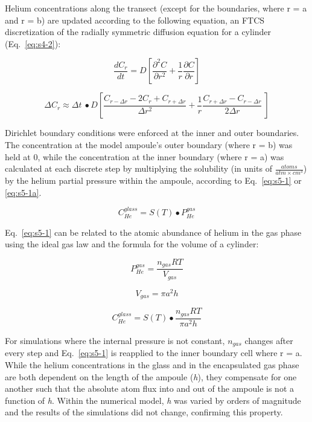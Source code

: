 Helium concentrations along the transect (except for the boundaries,
where r = a and r = b) are updated according to the following equation,
an FTCS discretization of the radially symmetric diffusion equation for
a cylinder (Eq.~\eqref{eq:s4-2}):

\[\frac{dC_{r}}{dt} = D\left\lbrack \frac{\partial^{2}C}{\partial r^{2}} + \frac{1}{r}\frac{\partial C}{\partial r} \right\rbrack\]

\begin{equation}
\Delta C_{r} \approx \Delta t\  \bullet D\left\lbrack \frac{C_{r - \Delta r} - 2C_{r} + C_{r + \Delta r}}{\Delta r^{2}} + \frac{1}{r}\frac{C_{r + \Delta r} - C_{r - \Delta r}}{2\Delta r}\  \right\rbrack
\label{eq:s5-0}
\end{equation}

Dirichlet boundary conditions were enforced at the inner and outer
boundaries. The concentration at the model ampoule's outer boundary
(where r = b) was held at 0, while the concentration at the inner
boundary (where r = a) was calculated at each discrete step by
multiplying the solubility (in units of
\(\frac{atoms}{atm \times cm^{3}}\)) by the helium partial pressure
within the ampoule, according to Eq.~\eqref{eq:s5-1} or \eqref{eq:s5-1a}.

\begin{equation}
C_{He}^{glass} = S(T) \bullet P_{He}^{gas}
\label{eq:s5-1}
\end{equation}

Eq.~\eqref{eq:s5-1} can be related to the atomic abundance of helium in the gas
phase using the ideal gas law and the formula for the volume of a
cylinder:

\[P_{He}^{gas} = \frac{n_{gas}RT}{V_{gas}}\]

\[V_{gas} = \pi a^{2}h\]

\begin{equation}
C_{He}^{glass} = S(T) \bullet \frac{n_{gas}RT}{\pi a^{2}h}
\label{eq:s5-1a}
\end{equation}

For simulations where the internal pressure is not constant, \(n_{gas}\)
changes after every step and Eq.~\eqref{eq:s5-1} is reapplied to the inner
boundary cell where r = a. While the helium concentrations in the glass
and in the encapsulated gas phase are both dependent on the length of
the ampoule (\emph{h}), they compensate for one another such that the
absolute atom flux into and out of the ampoule is not a function of
\emph{h}. Within the numerical model, \emph{h} was varied by orders of
magnitude and the results of the simulations did not change, confirming
this property.

